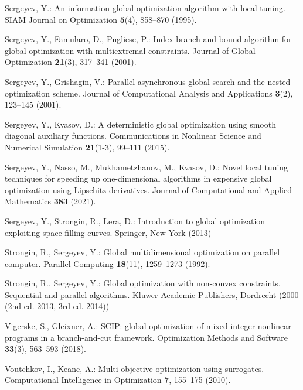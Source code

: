 \documentclass{svproc}
\begin{document}
\begin{thebibliography}{10}
Sergeyev, Y.: An information global optimization algorithm with local tuning.
\newblock SIAM Journal on Optimization \textbf{5}(4), 858--870 (1995).
\newblock {}

Sergeyev, Y., Famularo, D., Pugliese, P.: Index branch-and-bound algorithm for
  global optimization with multiextremal constraints.
\newblock Journal of Global Optimization \textbf{21}(3), 317--341 (2001).
\newblock {}

Sergeyev, Y., Grishagin, V.: Parallel asynchronous global search and the nested
  optimization scheme.
\newblock Journal of Computational Analysis and Applications \textbf{3}(2),
  123--145 (2001).
\newblock {}

Sergeyev, Y., Kvasov, D.: A deterministic global optimization using smooth
  diagonal auxiliary functions.
\newblock Communications in Nonlinear Science and Numerical Simulation
  \textbf{21}(1-3), 99--111 (2015).
\newblock {}

Sergeyev, Y., Nasso, M., Mukhametzhanov, M., Kvasov, D.: Novel local tuning
  techniques for speeding up one-dimensional algorithms in expensive global
  optimization using {Lipschitz} derivatives.
\newblock Journal of Computational and Applied Mathematics \textbf{383} (2021).
\newblock {}

Sergeyev, Y., Strongin, R., Lera, D.: Introduction to global optimization
  exploiting space-filling curves.
\newblock Springer, New York (2013)

Strongin, R., Sergeyev, Y.: Global multidimensional optimization on parallel
  computer.
\newblock Parallel Computing \textbf{18}(11), 1259--1273 (1992).
\newblock {}

Strongin, R., Sergeyev, Y.: Global optimization with non-convex constraints.
  Sequential and parallel algorithms.
\newblock Kluwer Academic Publishers, Dordrecht (2000 (2nd ed. 2013, 3rd ed.
  2014))

Vigerske, S., Gleixner, A.: {SCIP}: global optimization of mixed-integer
  nonlinear programs in a branch-and-cut framework.
\newblock Optimization Methods and Software \textbf{33}(3), 563--593 (2018).
\newblock {}

Voutchkov, I., Keane, A.: Multi-objective optimization using surrogates.
\newblock Computational Intelligence in Optimization \textbf{7}, 155--175
  (2010).
\newblock {}


\end{thebibliography}
\end{document}
